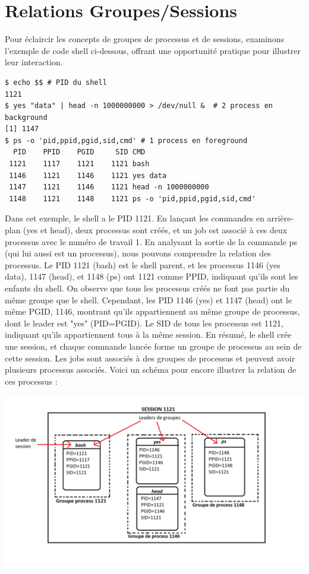 \section{Relations Groupes/Sessions}

Pour éclaircir les concepts de groupes de processus et de sessions, examinons l'exemple de code shell ci-dessous, offrant une opportunité pratique pour illustrer leur interaction.

\begin{lstlisting}
$ echo $$ # PID du shell
1121
$ yes "data" | head -n 1000000000 > /dev/null &  # 2 process en background
[1] 1147
$ ps -o 'pid,ppid,pgid,sid,cmd' # 1 process en foreground
  PID    PPID    PGID     SID CMD
 1121    1117    1121    1121 bash
 1146    1121    1146    1121 yes data
 1147    1121    1146    1121 head -n 1000000000
 1148    1121    1148    1121 ps -o 'pid,ppid,pgid,sid,cmd'
\end{lstlisting}

Dans cet exemple, le shell a le PID 1121. En lançant les commandes en arrière-plan (yes et head), deux processus sont créés, et un job est associé à ces deux processus avec le numéro de travail 1. 
En analysant la sortie de la commande ps (qui lui aussi est un processus), nous pouvons comprendre la relation des processus.
\newline
Le PID 1121 (bash) est le shell parent, et les processus 1146 (yes data), 1147 (head), et 1148 (ps) ont 1121 comme PPID, indiquant qu'ils sont les enfants du shell. 
On observe que tous les processus créés ne font pas partie du même groupe que le shell. Cependant, les PID 1146 (yes) et 1147 (head) ont le même PGID, 1146, montrant qu'ils appartiennent au 
même groupe de processus, dont le leader est "yes" (PID=PGID). Le SID de tous les processus est 1121, indiquant qu'ils appartiennent tous à la même session.
\newline
En résumé, le shell crée une session, et chaque commande lancée forme un groupe de processus au sein de cette session. Les jobs sont associés à des groupes de processus et peuvent avoir 
plusieurs processus associés.
\newline
\newline
\newline
Voici un schéma pour encore illustrer la relation de ces processus : 

\includegraphics[width=1\textwidth]{img/relationshipSchema.png}